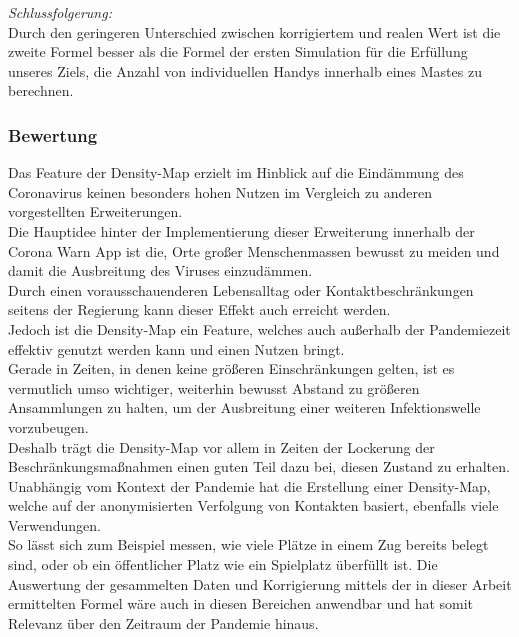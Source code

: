 \documentclass[conference]{IEEEtran}
\begin{document}
\textit{Schlussfolgerung:}\\
Durch den geringeren Unterschied zwischen korrigiertem und realen Wert ist die zweite Formel besser als die Formel der ersten Simulation für die Erfüllung unseres Ziels, die Anzahl von individuellen Handys innerhalb eines Mastes zu berechnen.\\

\subsubsection{Bewertung}
Das Feature der Density-Map erzielt im Hinblick auf die Eindämmung des Coronavirus keinen besonders hohen Nutzen im Vergleich zu anderen vorgestellten Erweiterungen.\\
Die Hauptidee hinter der Implementierung dieser Erweiterung innerhalb der Corona Warn App ist die, Orte großer Menschenmassen bewusst zu meiden und damit die Ausbreitung des Viruses einzudämmen.\\
Durch einen vorausschauenderen Lebensalltag oder Kontaktbeschränkungen seitens der Regierung kann dieser Effekt auch erreicht werden.\\
Jedoch ist die Density-Map ein Feature, welches auch außerhalb der Pandemiezeit effektiv genutzt werden kann und einen Nutzen bringt.\\
Gerade in Zeiten, in denen keine größeren Einschränkungen gelten, ist es vermutlich umso wichtiger, weiterhin bewusst Abstand zu größeren Ansammlungen zu halten, um der Ausbreitung einer weiteren Infektionswelle vorzubeugen.\\
Deshalb trägt die Density-Map vor allem in Zeiten der Lockerung der Beschränkungsmaßnahmen einen guten Teil dazu bei, diesen Zustand zu erhalten.\\
Unabhängig vom Kontext der Pandemie hat die Erstellung einer Density-Map, welche auf der anonymisierten Verfolgung von Kontakten basiert, ebenfalls viele Verwendungen.\\
So lässt sich zum Beispiel messen, wie viele Plätze in einem Zug bereits belegt sind, oder ob ein öffentlicher Platz wie ein Spielplatz überfüllt ist. Die Auswertung der gesammelten Daten und Korrigierung mittels der in dieser Arbeit ermittelten Formel wäre auch in diesen Bereichen anwendbar und hat somit Relevanz über den Zeitraum der Pandemie hinaus.\\
\end{document}

